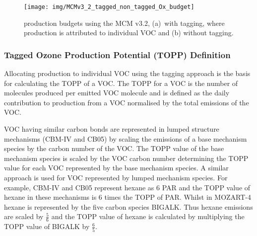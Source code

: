 \begin{figure}
    \centering
    \texttt{[image: img/MCMv3\_2\_tagged\_non\_tagged\_Ox\_budget]}
    \vspace{2mm}
    \caption{ production budgets using the MCM v3.2, \mbox{(a) with} tagging, where  production is attributed to individual VOC and (b) without tagging.}
    \vspace{-4mm}
    \label{f:Ox_budget}
\end{figure} 

\subsubsection{Tagged Ozone Production Potential (TOPP) Definition} \label{sss:TOPP} %

Allocating  production to individual VOC using the tagging approach is the basis for calculating the TOPP of a VOC.
The TOPP for a VOC is the number of  molecules produced per emitted VOC molecule and is defined as the daily contribution to  production from a VOC normalised by the total emissions of the VOC.

VOC having similar carbon bonds are represented in lumped structure mechanisms (CBM-IV and CB05) by scaling the emissions of a base mechanism species by the carbon number of the VOC.
The TOPP value of the base mechanism species is scaled by the VOC carbon number determining the TOPP value for each VOC represented by the base mechanism species.
A similar approach is used for VOC represented by lumped mechanism species.
For example, CBM-IV and CB05 represent hexane as $6$ PAR and the TOPP value of hexane in these mechanisms is $6$ times the TOPP of PAR.
Whilst in MOZART-4 hexane is represented by the five carbon species BIGALK.
Thus hexane emissions are scaled by $\frac{5}{6}$ and the TOPP value of hexane is calculated by multiplying the TOPP value of BIGALK by $\frac{6}{5}$.
